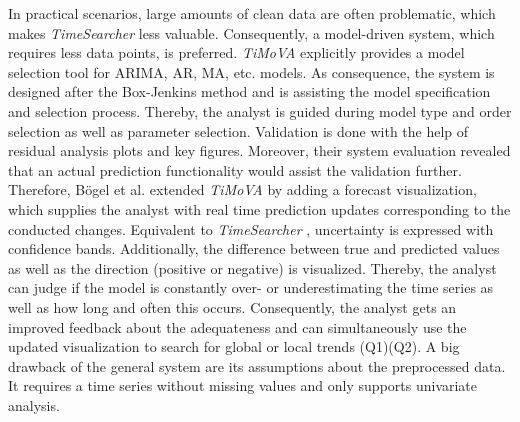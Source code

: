 \documentclass[electronic]{vgtc}             %
\begin{document}
In practical scenarios, large amounts of clean data are often problematic, which makes \textit{TimeSearcher} \cite{buono:2007} less valuable.
Consequently, a model-driven system, which requires less data points, is preferred.
\textit{TiMoVA} \cite{boegl:2013} explicitly provides a model selection tool for  ARIMA, AR, MA, etc. models.
As consequence, the system is designed after the Box-Jenkins method and is assisting the model specification and selection process.
Thereby, the analyst is guided during model type and order selection as well as parameter selection.
Validation is done with the help of residual analysis plots and key figures.
Moreover, their system evaluation revealed that an actual prediction functionality would assist the validation further.
Therefore, B\"ogel et al. \cite{boegl:2014} extended \textit{TiMoVA} by adding a forecast visualization, which supplies the analyst with real time prediction updates corresponding to the conducted changes.
Equivalent to \textit{TimeSearcher} \cite{buono:2007}, uncertainty is expressed with confidence bands. 
Additionally, the difference between true and predicted values as well as the direction (positive or negative) is visualized.
Thereby, the analyst can judge if the model is constantly over- or underestimating the time series as well as how long and often this occurs.
Consequently, the analyst gets an improved feedback about the adequateness and can
simultaneously use the updated visualization to search for global or local trends (Q1)(Q2).
A big drawback of the general system are its assumptions about the preprocessed data. 
It requires a time series without missing values and only supports univariate analysis.
\end{document}

